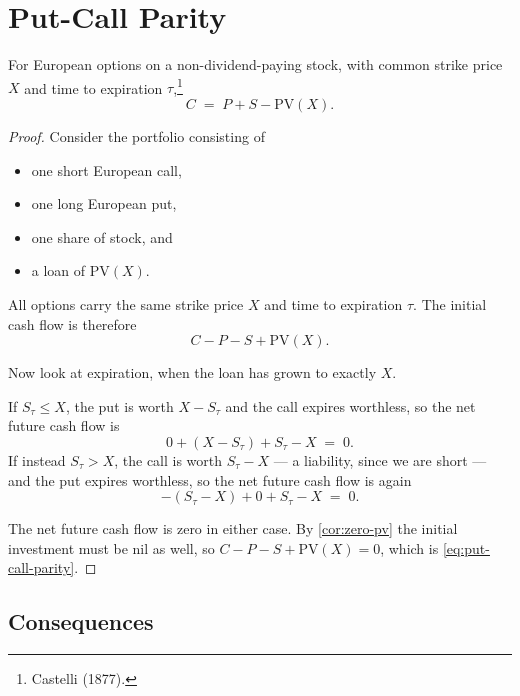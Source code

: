 \section{Put-Call Parity}
\label{sec:put-call-parity}


\begin{theorem}
	\label{thm:put-call-parity}
	For European options on a non-dividend-paying stock, with common strike price $X$ and time to expiration $\tau$,\footnote{Castelli (1877).}
	\begin{equation}
		C \;=\; P + S - \mathrm{PV}(X) .
		\label{eq:put-call-parity}
	\end{equation}
\end{theorem}

\begin{proof}
	Consider the portfolio consisting of
	\begin{itemize}[nosep]
		\item one short European call,
		\item one long European put,
		\item one share of stock, and
		\item a loan of $\mathrm{PV}(X)$.
	\end{itemize}
	All options carry the same strike price $X$ and time to expiration $\tau$.
	The initial cash flow is therefore
	\[
		C - P - S + \mathrm{PV}(X) .
	\]

	Now look at expiration, when the loan has grown to exactly $X$.

	If $S_{\tau}\le X$, the put is worth $X-S_{\tau}$ and the call expires worthless, so the net future cash flow is
	\[
		0 + (X-S_{\tau}) + S_{\tau} - X \;=\; 0 .
	\]
	If instead $S_{\tau}>X$, the call is worth $S_{\tau}-X$ --- a liability, since we are short --- and the put expires worthless, so the net future cash flow is again
	\[
		-(S_{\tau}-X) + 0 + S_{\tau} - X \;=\; 0 .
	\]

	The net future cash flow is zero in either case.
	By \autoref{cor:zero-pv} the initial investment must be nil as well, so $C-P-S+\mathrm{PV}(X)=0$, which is \eqref{eq:put-call-parity}.
\end{proof}

\subsection{Consequences}

